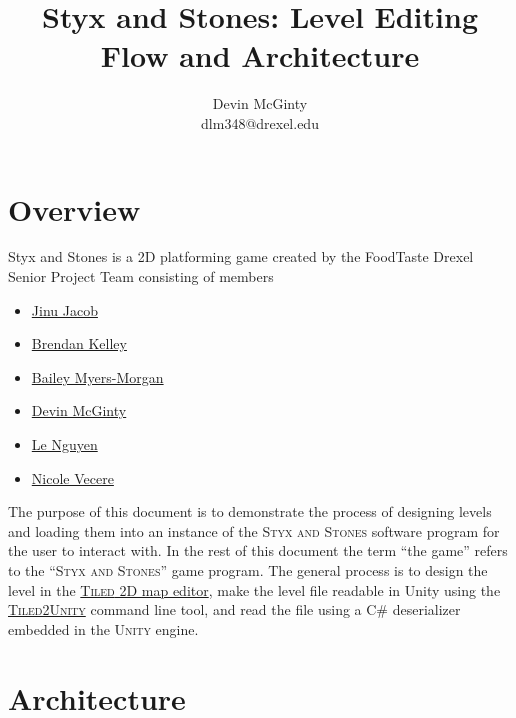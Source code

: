 \documentclass{article}
\title{Styx and Stones: Level Editing Flow and Architecture}
\author{
    \large
    Devin McGinty\\
    \normalsize
    dlm348@drexel.edu
}
\begin{document}
\maketitle

\tableofcontents
\newpage

\section{Overview}
Styx and Stones is a 2D platforming game created by the FoodTaste Drexel Senior Project Team consisting of members
\begin{itemize}
    \item \href{mailto:jinu.jacob@drexel.edu}{Jinu Jacob}
    \item \href{mailto:brendan.k.kelley@drexel.edu}{Brendan Kelley}
    \item \href{mailto:bailey.s.myers-morgan@drexel.edu}{Bailey Myers-Morgan}
    \item \href{mailto:dlm348@drexel.edu}{Devin McGinty}
    \item \href{mailto:le.n.nguyen@drexel.edu}{Le Nguyen}
    \item \href{mailto:nicole.m.vecere@drexel.edu}{Nicole Vecere}
\end{itemize}

The purpose of this document is to demonstrate the process of designing levels and loading them into an instance of
the \textsc{Styx and Stones} software program for the user to interact with. In the rest of this document the term
``the game'' refers to the ``\textsc{Styx and Stones}'' game program. The general process is to design the level in the
\href{http://www.mapeditor.org}{\textsc{Tiled} 2D map editor}, make the level file readable in Unity using the
\href{http://www.seanba.com/tiled2unity}{\textsc{Tiled2Unity}} command line tool, and read the file using a C\#
deserializer embedded in the \textsc{Unity} engine.

\section{Architecture}
\end{document}
